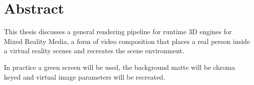 %
\chapter*{Abstract}
\label{sec:abstract}
\vspace*{-10mm}

This thesis discusses a general rendering pipeline for runtime 3D engines for 
Mixed Reality Media, a form of video composition that places a real person 
inside a virtual reality scenes and recreates the scene environment.

In practice a green screen will be used, the background matte will be chroma 
keyed and virtual image parameters will be recreated.